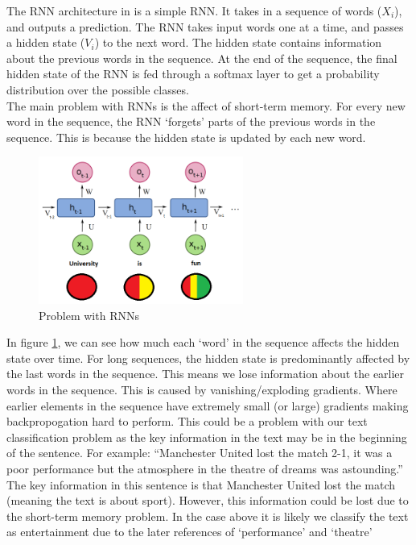 The RNN architecture in  is a simple RNN. It takes in a sequence of words ($X_i$), and outputs a prediction. The RNN takes input
words one at a time, and passes a hidden state ($V_i$) to the next word. The hidden state contains information about the previous words in the
sequence. At the end of the sequence, the final hidden state of the RNN is fed through a softmax layer to get a probability distribution over the
possible classes.\\
The main problem with RNNs is the affect of short-term memory. For every new word in the sequence, the RNN `forgets' parts of the
previous words in the sequence. This is because the hidden state is updated by each new word.
\begin{figure}
    \centering
    \includegraphics[width=0.6\textwidth]{../images/shortterm-problem.png}
    \caption{Problem with RNNs}
    \label{fig:stm}
\end{figure}

In figure \ref{fig:stm}, we can see how much each `word' in the sequence affects the hidden state over time. For long sequences,
the hidden state is predominantly affected by the last words in the sequence. This means we lose information about the earlier words
in the sequence. This is caused by vanishing/exploding gradients. Where earlier elements in the sequence have extremely small (or large)
gradients making backpropogation hard to perform. This could be a problem with our text classification problem as the key information in the text may be in the
beginning of the sentence. For example: ``Manchester United lost the match 2-1, it was a poor performance but the atmosphere in the
theatre of dreams was astounding.'' The key information in this sentence is that Manchester United lost the match (meaning the text
is about sport). However, this information could be lost due to the short-term memory problem. In the case above it is likely
we classify the text as entertainment due to the later references of `performance' and `theatre'\\
